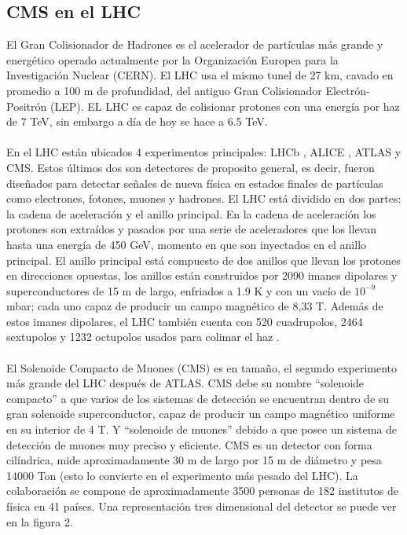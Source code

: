 \label{sec:examples}

\subsection{CMS en el LHC}
El Gran Colisionador de Hadrones es el acelerador de partículas más grande y energético operado actualmente por la Organización Europea para la Investigación Nuclear (CERN). El LHC usa el mismo tunel de 27 km, cavado en promedio a 100 m de profundidad, del antiguo Gran Colisionador Electrón-Positrón (LEP). EL LHC es capaz de colisionar protones con una energía por haz de 7 TeV, sin embargo a día de hoy se hace a 6.5 TeV.
\\
\\
En el LHC están ubicados 4 experimentos principales: LHCb \cite{Alves:2008zz}, ALICE \cite{Aamodt:2008zz}, ATLAS \cite{Aad:2008zzm} y CMS. Estos últimos dos son detectores de proposito general, es decir, fueron diseñados para detectar señales de nueva física en estados finales de partículas como electrones, fotones, muones y hadrones. El LHC está dividido en dos partes: la cadena de aceleración y el anillo principal. En la cadena de aceleración los protones son extraídos y pasados por una serie de aceleradores que los llevan hasta una energía de 450 GeV, momento en que son inyectados en el anillo principal. El anillo principal está compuesto de dos anillos que llevan los protones en direcciones opuestas, los anillos están construidos por 2090 imanes dipolares y superconductores de 15 m de largo, enfriados a 1.9 K y con un vacío de $10^{-9}$mbar; cada uno capaz de producir un campo magnético de 8,33 T. Además de estos imanes dipolares, el LHC también cuenta con 520 cuadrupolos, 2464 sextupolos y 1232 octupolos usados para colimar el haz \cite{RuizAlvarez:2016mhn}. 
\\
\\
El Solenoide Compacto de Muones (CMS) es en tamaño, el segundo experimento más grande del LHC después de ATLAS. CMS debe su nombre ``solenoide compacto'' a que varios de los sistemas de detección se encuentran dentro de su gran solenoide superconductor, capaz de producir un campo magnético uniforme en su interior de 4 T. Y ``solenoide de muones'' debido a que posee un sistema de detección de muones muy preciso y eficiente. CMS es un detector con forma cilíndrica, mide aproximadamente 30 m de largo por 15 m de diámetro y pesa 14000 Ton (esto lo convierte en el experimento más pesado del LHC). La colaboración se compone de aproximadamente 3500 personas de 182 institutos de física en 41 países. Una representación tres dimensional del detector se puede ver en la figura 2.
